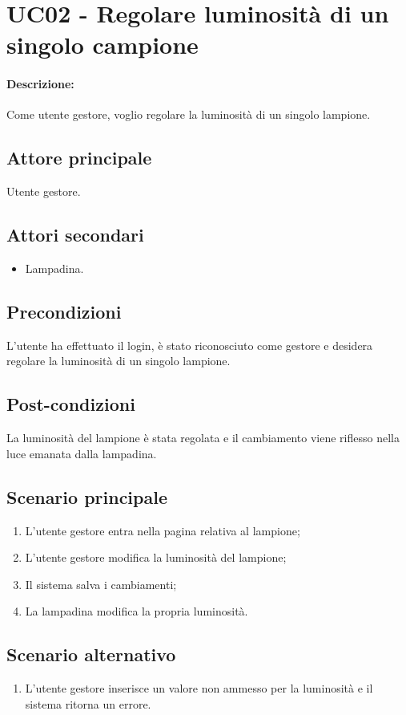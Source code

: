 \section{UC02 - Regolare luminosità di un singolo campione}

\paragraph{Descrizione:}
Come utente gestore, voglio regolare la luminosità di un singolo lampione.

\subsection{Attore principale}
Utente gestore.

\subsection{Attori secondari}
\begin{itemize}
    \item Lampadina.
\end{itemize}

\subsection{Precondizioni}
L'utente ha effettuato il login, è stato riconosciuto come gestore e desidera regolare la luminosità di un singolo lampione.

\subsection{Post-condizioni}
La luminosità del lampione è stata regolata e il cambiamento viene riflesso nella luce emanata dalla lampadina.

\subsection{Scenario principale}
\begin{enumerate}
    \item L'utente gestore entra nella pagina relativa al lampione;
    \item L'utente gestore modifica la luminosità del lampione;
    \item Il sistema salva i cambiamenti;
    \item La lampadina modifica la propria luminosità.
\end{enumerate}

\subsection{Scenario alternativo}
\begin{enumerate}
    \item L'utente gestore inserisce un valore non ammesso per la luminosità e il sistema ritorna un errore.
\end{enumerate}
